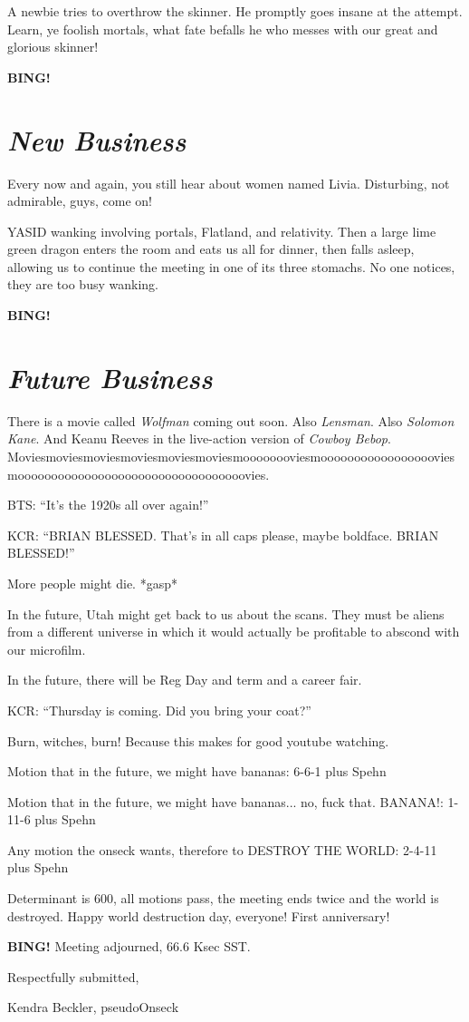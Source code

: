 \documentclass[10pt]{article}
\newcommand{\bing}{{\bf BING!} }
\newcommand{\goto}[1]{\bing \vskip 12pt \section*{{\em{#1}}}}
\newcommand{\ps}{ plus Spehn\xspace}
\newcommand{\onseck}{Kendra Beckler, pseudoOnseck}
\begin{document}
A newbie tries to overthrow the skinner.  He promptly goes insane at the 
attempt.  Learn, ye foolish mortals, what fate befalls he who messes with
our great and glorious skinner!

\goto{New Business}

Every now and again, you still hear about women named Livia.  Disturbing, not
admirable, guys, come on!

YASID wanking involving portals, Flatland, and relativity.  Then a large lime 
green dragon enters the room and eats us all for dinner, then falls asleep, 
allowing us to continue the meeting in one of its three stomachs.  No one 
notices, they are too busy wanking.

\goto{Future Business}

There is a movie called \textit{Wolfman} coming out soon.  Also 
\textit{Lensman}.  Also \textit{Solomon Kane}.  And Keanu Reeves in the 
live-action version of \textit{Cowboy Bebop}.  
Moviesmoviesmoviesmoviesmoviesmoviesmoooooooviesmoooooooooooooooooviesmoooooooooooooooooooooooooooooooooovies.

BTS: ``It's the 1920s all over again!''

KCR: ``BRIAN BLESSED.  That's in all caps please, maybe boldface.  BRIAN 
BLESSED!''

More people might die.  *gasp*

In the future, Utah might get back to us about the scans.  They must be aliens
from a different universe in which it would actually be profitable to abscond
with our microfilm.

In the future, there will be Reg Day and term and a career fair.

KCR: ``Thursday is coming.  Did you bring your coat?''

Burn, witches, burn!  Because this makes for good youtube watching.

Motion that in the future, we might have bananas: 6-6-1 \ps

Motion that in the future, we might have bananas... no, fuck that.  BANANA!: 
1-11-6 \ps

Any motion the onseck wants, therefore to DESTROY THE WORLD: 2-4-11 \ps

Determinant is 600, all motions pass, the meeting ends twice and the world is
destroyed.  Happy world destruction day, everyone!  First anniversary!

\bing
\noindent
Meeting adjourned, 66.6 Ksec SST.

\vspace{18pt}

\centerline{Respectfully submitted,}
\centerline{\onseck}
\end{document}
